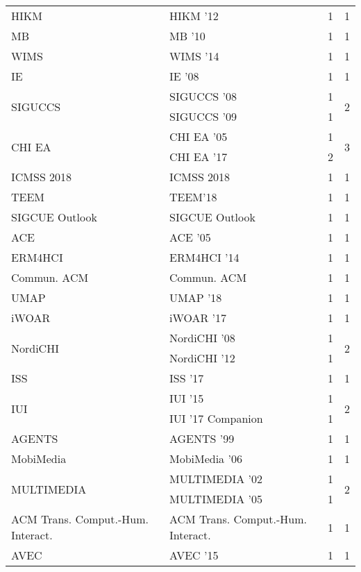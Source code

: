 \begin{table*}[t]
\begin{tabular}{llrr}
\multirow{1}{*}{HIKM } & HIKM '12 & 1 & \multirow{1}{*}{1}\\
\multirow{1}{*}{MB } & MB '10 & 1 & \multirow{1}{*}{1}\\
\multirow{1}{*}{WIMS } & WIMS '14 & 1 & \multirow{1}{*}{1}\\
\multirow{1}{*}{IE } & IE '08 & 1 & \multirow{1}{*}{1}\\
\multirow{2}{*}{SIGUCCS } & SIGUCCS '08 & 1 & \multirow{2}{*}{2}\\
& SIGUCCS '09 & 1 &\\
\multirow{2}{*}{CHI EA } & CHI EA '05 & 1 & \multirow{2}{*}{3}\\
& CHI EA '17 & 2 &\\
\multirow{1}{*}{ICMSS 2018} & ICMSS 2018 & 1 & \multirow{1}{*}{1}\\
\multirow{1}{*}{TEEM} & TEEM'18 & 1 & \multirow{1}{*}{1}\\
\multirow{1}{*}{SIGCUE Outlook} & SIGCUE Outlook & 1 & \multirow{1}{*}{1}\\
\multirow{1}{*}{ACE } & ACE '05 & 1 & \multirow{1}{*}{1}\\
\multirow{1}{*}{ERM4HCI } & ERM4HCI '14 & 1 & \multirow{1}{*}{1}\\
\multirow{1}{*}{Commun. ACM} & Commun. ACM & 1 & \multirow{1}{*}{1}\\
\multirow{1}{*}{UMAP } & UMAP '18 & 1 & \multirow{1}{*}{1}\\
\multirow{1}{*}{iWOAR } & iWOAR '17 & 1 & \multirow{1}{*}{1}\\
\multirow{2}{*}{NordiCHI } & NordiCHI '08 & 1 & \multirow{2}{*}{2}\\
& NordiCHI '12 & 1 &\\
\multirow{1}{*}{ISS } & ISS '17 & 1 & \multirow{1}{*}{1}\\
\multirow{2}{*}{IUI } & IUI '15 & 1 & \multirow{2}{*}{2}\\
& IUI '17 Companion & 1 &\\
\multirow{1}{*}{AGENTS } & AGENTS '99 & 1 & \multirow{1}{*}{1}\\
\multirow{1}{*}{MobiMedia } & MobiMedia '06 & 1 & \multirow{1}{*}{1}\\
\multirow{2}{*}{MULTIMEDIA } & MULTIMEDIA '02 & 1 & \multirow{2}{*}{2}\\
& MULTIMEDIA '05 & 1 &\\
\multirow{1}{*}{ACM Trans. Comput.-Hum. Interact.} & ACM Trans. Comput.-Hum. Interact. & 1 & \multirow{1}{*}{1}\\
\multirow{1}{*}{AVEC } & AVEC '15 & 1 & \multirow{1}{*}{1}\\

\end{tabular}
\end{table*}
